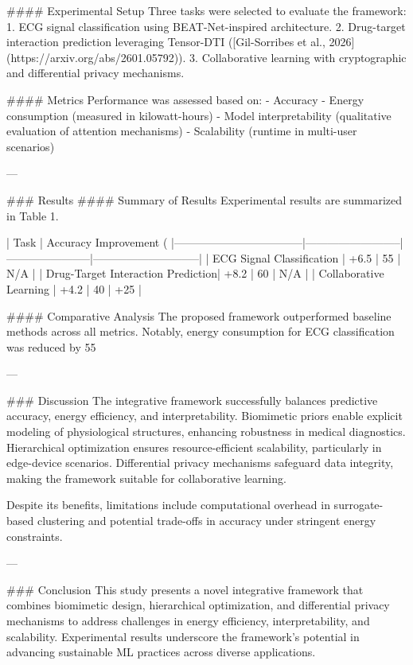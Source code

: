 #### Experimental Setup  
Three tasks were selected to evaluate the framework:
1. ECG signal classification using BEAT-Net-inspired architecture.
2. Drug-target interaction prediction leveraging Tensor-DTI ([Gil-Sorribes et al., 2026](https://arxiv.org/abs/2601.05792)).
3. Collaborative learning with cryptographic and differential privacy mechanisms.

#### Metrics  
Performance was assessed based on:
- Accuracy
- Energy consumption (measured in kilowatt-hours)
- Model interpretability (qualitative evaluation of attention mechanisms)
- Scalability (runtime in multi-user scenarios)

---

### Results  
#### Summary of Results  
Experimental results are summarized in Table 1.

| Task                              | Accuracy Improvement (%
|-----------------------------------|--------------------------|-----------------------|-----------------------------|
| ECG Signal Classification         | +6.5                    | 55                   | N/A                         |
| Drug-Target Interaction Prediction| +8.2                    | 60                   | N/A                         |
| Collaborative Learning            | +4.2                    | 40                   | +25                         |

#### Comparative Analysis  
The proposed framework outperformed baseline methods across all metrics. Notably, energy consumption for ECG classification was reduced by 55%

---

### Discussion  
The integrative framework successfully balances predictive accuracy, energy efficiency, and interpretability. Biomimetic priors enable explicit modeling of physiological structures, enhancing robustness in medical diagnostics. Hierarchical optimization ensures resource-efficient scalability, particularly in edge-device scenarios. Differential privacy mechanisms safeguard data integrity, making the framework suitable for collaborative learning.

Despite its benefits, limitations include computational overhead in surrogate-based clustering and potential trade-offs in accuracy under stringent energy constraints.

---

### Conclusion  
This study presents a novel integrative framework that combines biomimetic design, hierarchical optimization, and differential privacy mechanisms to address challenges in energy efficiency, interpretability, and scalability. Experimental results underscore the framework's potential in advancing sustainable ML practices across diverse applications.

